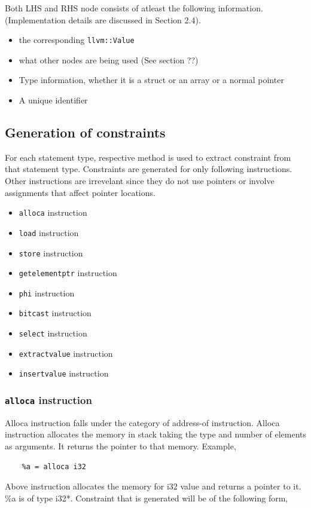 \documentclass[a4paper,12pt]{report}
\begin{document}
\noindent
Both LHS and RHS node consists of atleast the following information. 
(Implementation details are discussed in Section 2.4).

\begin{itemize}
    \item the corresponding \texttt{llvm::Value}
    \item what other nodes are being used (See section ??)
    \item Type information, whether it is a struct or an array or a normal 
pointer
    \item A unique identifier
\end{itemize}

\subsection{Generation of constraints}
For each statement type, respective method is used to extract constraint from
that statement type. Constraints are generated for only following instructions.
Other instructions are irrevelant since they do not use pointers or involve
assignments that affect pointer locations.

\begin{itemize}
    \item \texttt{alloca} instruction
    \item \texttt{load} instruction
    \item \texttt{store} instruction
    \item \texttt{getelementptr} instruction
    \item \texttt{phi} instruction
    \item \texttt{bitcast} instruction
    \item \texttt{select} instruction
    \item \texttt{extractvalue} instruction
    \item \texttt{insertvalue} instruction
\end{itemize}

\subsubsection{\texttt{alloca} instruction}
Alloca instruction falls under the category of address-of instruction. Alloca 
instruction allocates the memory in stack taking the type and number of 
elements as arguments. It returns the pointer to that memory. 
Example,

\begin{lstlisting}
    %a = alloca i32
\end{lstlisting}
\noindent
Above instruction allocates the memory for i32 value and returns a pointer to 
it. \%a is of type i32*. Constraint that is generated will be of the following 
form,
\end{document}
